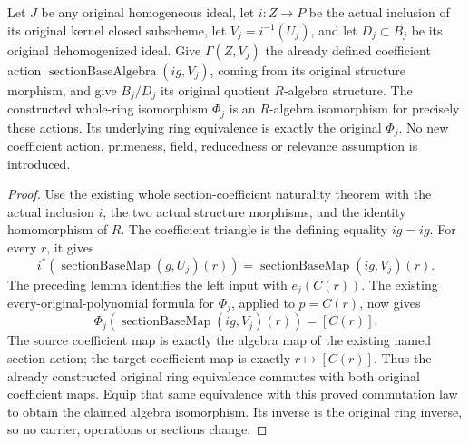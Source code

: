 \begin{lemma}\label{lem:original-native-quotient-coordinate-algebra}
\leanok
{}
Let $J$ be any original homogeneous ideal, let $i:Z\to P$ be the actual
inclusion of its original kernel closed subscheme, let $V_j=i^{-1}(U_j)$,
and let $D_j\subset B_j$ be its original dehomogenized ideal.
Give $\Gamma(Z,V_j)$ the already defined coefficient action
$\operatorname{sectionBaseAlgebra}(i g,V_j)$, coming from its original
structure morphism, and give $B_j/D_j$ its original quotient $R$-algebra
structure. The constructed whole-ring isomorphism $\Phi_j$
is an $R$-algebra isomorphism for precisely these actions.
Its underlying ring equivalence is exactly the original $\Phi_j$.
No new coefficient action, primeness, field, reducedness or relevance
assumption is introduced.
\end{lemma}
\begin{proof}
Use the existing whole section-coefficient naturality theorem with the
actual inclusion $i$, the two actual structure morphisms, and the identity
homomorphism of $R$. The coefficient triangle is the defining equality
$i g=i g$. For every $r$, it gives
\[
 i^*(\operatorname{sectionBaseMap}(g,U_j)(r))
   =\operatorname{sectionBaseMap}(i g,V_j)(r).
\]
The preceding lemma identifies the left input with $e_j(C(r))$.
The existing every-original-polynomial formula for $\Phi_j$, applied to
$p=C(r)$, now gives
\[
 \Phi_j(\operatorname{sectionBaseMap}(i g,V_j)(r))=[C(r)].
\]
The source coefficient map is exactly the algebra map of the existing
named section action; the target coefficient map is exactly $r\mapsto[C(r)]$.
Thus the already constructed original ring equivalence commutes with both
original coefficient maps. Equip that same equivalence with this proved
commutation law to obtain the claimed algebra isomorphism. Its inverse
is the original ring inverse, so no carrier, operations or sections change.
\end{proof}
